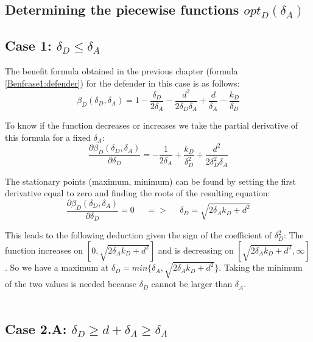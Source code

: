 \subsection{Determining the piecewise functions $opt_{D}(\delta_{A})$}


\subsection*{Case 1: $\delta_{D} \leq \delta_{A} $}
The benefit formula obtained in the previous chapter (formula \ref{Benfcase1:defender}) for the defender in this case is as follows:
\begin{equation*}
\beta_{D}(\delta_{D},\delta_{A}) = 1 - \dfrac{\delta_{D}}{2\delta_{A}} - \dfrac{d^{2}}{2\delta_{D}\delta_{A}} + \dfrac{d}{\delta_{A}}  - \dfrac{k_{D}}{\delta_{D}}
\end{equation*}

To know if the function decreases or increases we take the partial derivative of this formula for a fixed $\delta_{A}$:
\begin{equation*}\label{formdelta}
\frac{\partial \beta_{D}(\delta_{D},\delta_{A})}{\partial \delta_{D}} = - \dfrac{1}{2\delta_{A}} + \dfrac{k_{D}}{\delta_{D}^{2}} + \dfrac{d^{2}}{2\delta_{D}^{2}\delta_{A}}
\end{equation*}

The stationary points (maximum, minimum) can be found by setting the first derivative equal to zero and finding the roots of the resulting equation:
\begin{equation*}
\frac{\partial \beta_{D}(\delta_{D},\delta_{A})}{\partial \delta_{D}} =0 ~~~~~~ =>~~~~~~ \delta_{D} = \sqrt{2\delta_{A}k_{D} + d^{2}}
\end{equation*}

This leads to the following deduction given the sign of the coefficient of $\delta_{D}^{2}$: The function increases on $[0, \sqrt{2\delta_{A}k_{D} + d^{2}}]$ and is decreasing on $[\sqrt{2\delta_{A}k_{D} + d^{2}}, \infty]$. So we have a maximum at $\delta_{D} = min \{ \delta_{A}, \sqrt{2\delta_{A}k_{D} + d^{2}} \} $. Taking the minimum of the two values is needed because $\delta_{D}$ cannot be larger than $\delta_{A}$. \\
~~\\


\subsection*{Case 2.A: $\delta_{D} \geq d+\delta_{A} \geq \delta_{A} $ }

